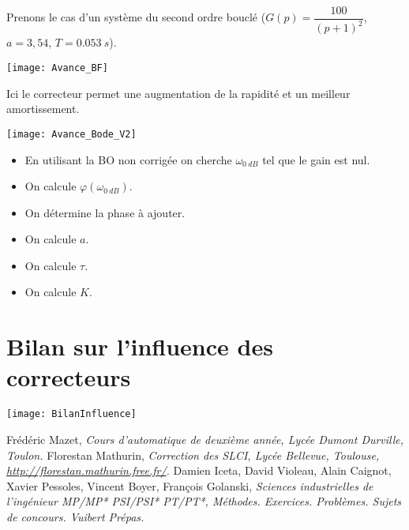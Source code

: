 \noindent
\begin{minipage}[c]{.46\linewidth}
Prenons le cas d'un système du second ordre bouclé ($G(p)=\dfrac{100}{\left(p+1\right)^2}$, $a=3,54$, $T=\SI{0,053}{s}$).

\begin{center}
\texttt{[image: Avance\_BF]}

\end{center}
Ici le correcteur permet une augmentation de la rapidité et un meilleur amortissement.
\end{minipage} \hfill
\begin{minipage}[c]{.46\linewidth}
\begin{center}
\texttt{[image: Avance\_Bode\_V2]}

\end{center}
\end{minipage} 



\begin{methode}
\begin{itemize}
\item En utilisant la BO non corrigée on cherche $\omega_{\SI{0}{dB}}$ tel que le gain est nul.
\item On calcule $\varphi\left(\omega_{\SI{0}{dB}}\right)$. 
\item On détermine la phase à ajouter. 
\item On calcule $a$. 
\item On calcule $\tau$.
\item On calcule $K$. 
\end{itemize}


\end{methode}


\section{Bilan sur l'influence des correcteurs}
\begin{center}
\texttt{[image: BilanInfluence]}
\end{center}

\begin{thebibliography}{2}
    Frédéric Mazet, {\it Cours d'automatique de deuxième année, Lycée Dumont Durville, Toulon.}
       Florestan Mathurin, {\it Correction des SLCI, Lycée Bellevue, Toulouse, \url{http://florestan.mathurin.free.fr/}.}
       Damien Iceta, David Violeau, Alain Caignot, Xavier Pessoles, Vincent Boyer, François Golanski, {\it Sciences industrielles de l'ingénieur MP/MP* PSI/PSI* PT/PT*, Méthodes. Exercices. Problèmes. Sujets de concours. Vuibert Prépas.}
\end{thebibliography}

%



